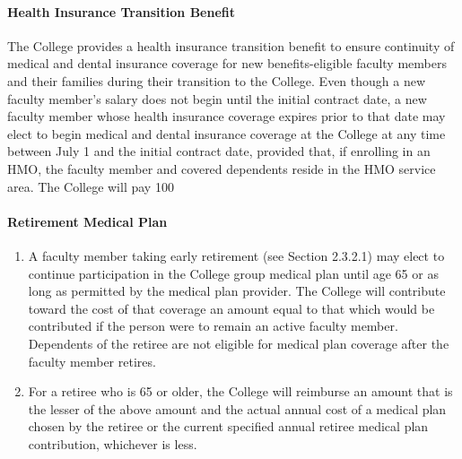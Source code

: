 \documentclass[letterpaper, 11pt]{article}
\begin{document}
			\paragraph{Health Insurance Transition Benefit}
				The College provides a health insurance transition benefit to ensure continuity of medical and dental insurance coverage for new benefits-eligible faculty members and their families during their transition to the College.  Even though a new faculty member's salary does not begin until the initial contract date, a new faculty member whose health insurance coverage expires prior to that date may elect to begin medical and dental insurance coverage at the College at any time between July 1 and the initial contract date, provided that, if enrolling in an HMO, the faculty member and covered dependents reside in the HMO service area.  The College will pay 100%
			\paragraph{Retirement Medical Plan}
				\begin{enumerate}[label=\alph*)]
					\item{A faculty member taking early retirement (see Section 2.3.2.1) may elect to continue participation in the College group medical plan until age 65 or as long as permitted by the medical plan provider.  The College will contribute toward the cost of that coverage an amount equal to that which would be contributed if the person were to remain an active faculty member.  Dependents of the retiree are not eligible for medical plan coverage after the faculty member retires.}
					\item{For a retiree who is 65 or older, the College will reimburse an amount that is the lesser of the above amount and the actual annual cost of a medical plan chosen by the retiree or the current specified annual retiree medical plan contribution, whichever is less.}
				\end{enumerate}
\end{document}
